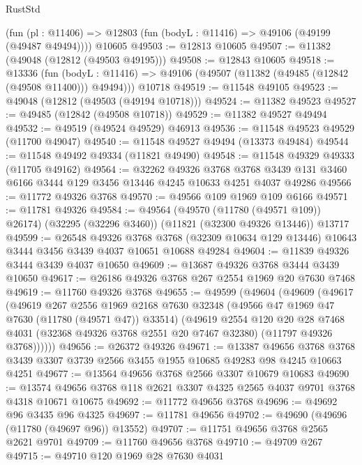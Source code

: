 \begin{lexlean}{RustStd}
\begin{coremodule}
    (fun (pl : @11406) => @12803 (fun (bodyL : @11416) => @49106 (@49199 (@49487 @49494))))
    @10605
@49503 := @12813 @10605
@49507 := @11382 (@49048 (@12812 (@49503 @49195)))
@49508 := @12843 @10605
@49518 := @13336
    (fun (bodyL : @11416) => @49106 (@49507 (@11382 (@49485 (@12842 (@49508 @11400))) @49494)))
    @10718
@49519 := @11548 @49105
@49523 := @49048 (@12812 (@49503 (@49194 @10718)))
@49524 := @11382 @49523
@49527 := @49485 (@12842 (@49508 @10718))
@49529 := @11382 @49527 @49494
@49532 := @49519 (@49524 @49529) @46913
@49536 := @11548 @49523 @49529 (@11700 @49047)
@49540 := @11548 @49527 @49494 (@13373 @49484)
@49544 := @11548 @49492 @49334 (@11821 @49490)
@49548 := @11548 @49329 @49333 (@11705 @49162)
@49564 := @32262
    @49326
    @3768
    @3768
    @3439
    @131
    @3460
    @6166
    @3444
    @129
    @3456
    @13446
    @4245
    @10633
    @4251
    @4037
    @49286
@49566 := @11772 @49326 @3768
@49570 := @49566 @109 @1969 @109 @6166
@49571 := @11781 @49326
@49584 := @49564
    (@49570 (@11780 (@49571 @109)) @26174)
    (@32295 (@32296 @3460))
    (@11821 (@32300 @49326 @13446))
    @13717
@49599 := @26548
    @49326
    @3768
    @3768
    (@32309 @10634 @129 @13446)
    @10643
    @3444
    @3456
    @3439
    @4037
    @10651
    @10688
    @49284
@49604 := @11839 @49326 @3444 @3439 @4037 @10650
@49609 := @13687 @49326 @3768 @3444 @3439 @10650
@49617 := @26186 @49326 @3768 @267 @2554 @1969 @20 @7630 @7468
@49619 := @11760 @49326 @3768
@49655 := @49599
    (@49604
      (@49609
        (@49617
          (@49619
            @267
            @2556
            @1969
            @2168
            @7630
            @32348
            (@49566 @47 @1969 @47 @7630 (@11780 (@49571 @47)) @33514)
            (@49619
              @2554
              @120
              @20
              @28
              @7468
              @4031
              (@32368 @49326 @3768 @2551 @20 @7467 @32380)
              (@11797 @49326 @3768))))))
@49656 := @26372 @49326
@49671 := @13387
    @49656
    @3768
    @3768
    @3439
    @3307
    @3739
    @2566
    @3455
    @1955
    @10685
    @49283
    @98
    @4245
    @10663
    @4251
@49677 := @13564 @49656 @3768 @2566 @3307 @10679 @10683
@49690 := @13574 @49656 @3768 @118 @2621 @3307 @4325 @2565 @4037 @9701 @3768 @4318 @10671 @10675
@49692 := @11772 @49656 @3768
@49696 := @49692 @96 @3435 @96 @4325
@49697 := @11781 @49656
@49702 := @49690 (@49696 (@11780 (@49697 @96)) @13552)
@49707 := @11751 @49656 @3768 @2565 @2621 @9701
@49709 := @11760 @49656 @3768
@49710 := @49709 @267
@49715 := @49710 @120 @1969 @28 @7630 @4031

\end{coremodule}
\end{lexlean}
